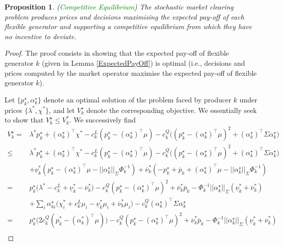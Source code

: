 \documentclass{article}
\newtheorem{proposition}{Proposition}
\begin{document}
\begin{proposition}
(\textcolor{green}{Competitive Equilibrium}) The stochastic market clearing problem produces prices and decisions maximising the expected pay-off of each flexible generator and supporting a competitive equilibrium from which they have no incentive to deviate.
\end{proposition}
\begin{proof}
The proof consists in showing that the expected pay-off of flexible generator $k$ (given in Lemma \ref{ExpectedPayOff}) is optimal (i.e., decisions and prices computed by the market operator maximise the expected pay-off of flexible generator $k$).

Let $\{p_k^\star, \alpha_k^\star\}$ denote an optimal solution of the problem faced by producer $k$ under prices $\{\lambda^*, \chi^*\}$, and let $V_k^\star$ denote the corresponding objective. We essentially seek to show that $V_k^\star \le V_k^*$. We successively find
\begin{align*}
    V_k^\star =& \lambda^*p_k^\star + (\alpha_k^\star)^\top \chi^* - c_k^L(p_k^\star - (\alpha_k^\star)^\top \mu) - c_k^Q\big((p_k^\star - (\alpha_k^\star)^\top \mu)^2 + (\alpha_k^\star)^\top \Sigma \alpha_k^\star\big)\\
    \le& \lambda^*p_k^\star + (\alpha_k^\star)^\top \chi^* - c_k^L(p_k^\star - (\alpha_k^\star)^\top \mu) - c_k^Q\big((p_k^\star - (\alpha_k^\star)^\top \mu)^2 + (\alpha_k^\star)^\top \Sigma \alpha_k^\star\big)\\
    &+ \underline{\nu}_k^*(p_k^\star - (\alpha_k^\star)^\top \mu - ||\alpha_k^\star||_{\Sigma} \Phi_k^{-1}) + \overline{\nu}_k^* (-p_k^\star + \overline{p}_k + (\alpha_k^\star)^\top \mu - ||\alpha_k^\star||_{\Sigma} \Phi_k^{-1})\\
    =& p_k^\star\big(\lambda^* - c_k^L + \underline{\nu}_k^* - \overline{\nu}_k^*\big) - c_k^Q(p_k^\star - (\alpha_k^\star)^\top \mu)^2 + \overline{\nu}_k^* \overline{p}_k - \Phi_k^{-1} ||\alpha_k^\star||_\Sigma (\underline{\nu}_k^* + \overline{\nu}_k^*)\\
    &+ \sum_i \alpha_{ki}^\star\big(\chi_i^* + c_k^L \mu_i - \underline{\nu}_k^* \mu_i + \overline{\nu}_k^* \mu_i\big) - c_k^Q (\alpha_k^\star)^\top \Sigma \alpha_k^\star \\
   =& p_k^\star\big(2c_k^Q(p_k^* - (\alpha_k^*)^\top \mu)\big) - c_k^Q(p_k^\star - (\alpha_k^\star)^\top \mu)^2 + \overline{\nu}_k^* \overline{p}_k - \Phi_k^{-1} ||\alpha_k^\star||_\Sigma (\underline{\nu}_k^* + \overline{\nu}_k^*)\\    

\end{align*}
\end{proof}
\end{document}
